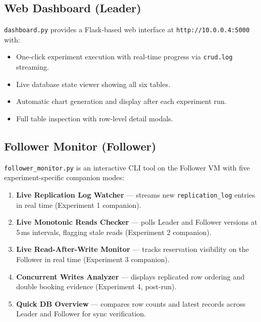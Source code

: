 \documentclass[12pt]{article}
\begin{document}
\subsection{Web Dashboard (Leader)}
\texttt{dashboard.py} provides a Flask-based web interface at \texttt{http://10.0.0.4:5000} with:
\begin{itemize}
    \item One-click experiment execution with real-time progress via \texttt{crud.log} streaming.
    \item Live database state viewer showing all six tables.
    \item Automatic chart generation and display after each experiment run.
    \item Full table inspection with row-level detail modals.
\end{itemize}

\subsection{Follower Monitor (Follower)}
\texttt{follower\_monitor.py} is an interactive CLI tool on the Follower VM with five experiment-specific companion modes:
\begin{enumerate}
    \item \textbf{Live Replication Log Watcher} --- streams new \texttt{replication\_log} entries in real time (Experiment 1 companion).
    \item \textbf{Live Monotonic Reads Checker} --- polls Leader and Follower versions at 5\,ms intervals, flagging stale reads (Experiment 2 companion).
    \item \textbf{Live Read-After-Write Monitor} --- tracks reservation visibility on the Follower in real time (Experiment 3 companion).
    \item \textbf{Concurrent Writes Analyzer} --- displays replicated row ordering and double booking evidence (Experiment 4, post-run).
    \item \textbf{Quick DB Overview} --- compares row counts and latest records across Leader and Follower for sync verification.
\end{enumerate}

\end{document}

